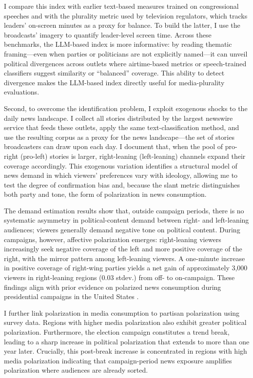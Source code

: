 \documentclass[12pt]{article}
\begin{document}
I compare this index with earlier text-based measures trained on congressional speeches and with the plurality metric used by television regulators, which tracks leaders’ on-screen minutes as a proxy for balance. To build the latter, I use the broadcasts’ imagery to quantify leader-level screen time. Across these benchmarks, the LLM-based index is more informative: by reading thematic framing—even when parties or politicians are not explicitly named—it can unveil political divergences across outlets where airtime-based metrics or speech-trained classifiers suggest similarity or “balanced” coverage. This ability to detect divergence makes the LLM-based index directly useful for media-plurality evaluations.
 

Second, to overcome the identification problem, I exploit exogenous shocks to the daily news landscape. I collect all stories distributed by the largest newswire service that feeds these outlets, apply the same text-classification method, and use the resulting corpus as a proxy for the news landscape—the set of stories broadcasters can draw upon each day. I document that, when the pool of pro-right (pro-left) stories is larger, right-leaning (left-leaning) channels expand their coverage accordingly. This exogenous variation identifies a structural model of news demand in which viewers’ preferences vary with ideology, allowing me to test the degree of confirmation bias and, because the slant metric distinguishes both party and tone, the form of polarization in news consumption.

The demand estimation results show that, outside campaign periods, there is no systematic asymmetry in political-content demand between right- and left-leaning audiences; viewers generally demand negative tone on political content. During campaigns, however, affective polarization emerges: right-leaning viewers increasingly seek negative coverage of the left and more positive coverage of the right, with the mirror pattern among left-leaning viewers. A one-minute increase in positive coverage of right-wing parties yields a net gain of approximately 3,000 viewers in right-leaning regions (0.03 stdev.) from off- to on-campaign. These findings align with prior evidence on polarized news consumption during presidential campaigns in the United States \citep{iyengar_affective,Peterson2017Echo}.


I further link polarization in media consumption to partisan polarization using survey data. Regions with higher media polarization also exhibit greater political polarization. Furthermore, the election campaign constitutes a trend break, leading to a sharp increase in political polarization that extends to more than one year later. Crucially, this post-break increase is concentrated in regions with high media polarization indicating that campaign-period news exposure amplifies polarization where audiences are already sorted.
\end{document}
